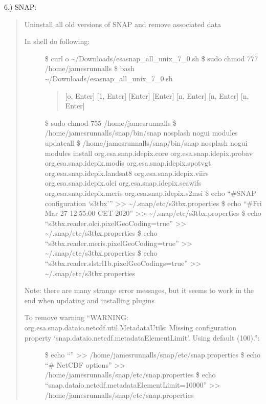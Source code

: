 \documentclass[letterpaper,10pt,english]{sphinxmanual}
\begin{document}
6.) SNAP: 
\begin{quote}

Uninstall all old versions of SNAP and remove associated data
\begin{description}
\item[{In shell do following:}] \leavevmode
\$ curl  \sphinxhyphen{}o \textasciitilde{}/Downloads/esa\sphinxhyphen{}snap\_all\_unix\_7\_0.sh
\$ sudo chmod 777 /home/jamesrunnalls
\$ bash \textasciitilde{}/Downloads/esa\sphinxhyphen{}snap\_all\_unix\_7\_0.sh
\begin{quote}

{[}o, Enter{]}
{[}1, Enter{]}
{[}Enter{]}
{[}Enter{]}
{[}n, Enter{]}
{[}n, Enter{]}
{[}n, Enter{]}
\end{quote}

\$ sudo chmod 755 /home/jamesrunnalls
\$ /home/jamesrunnalls/snap/bin/snap \textendash{}nosplash \textendash{}nogui \textendash{}modules \textendash{}update\sphinxhyphen{}all
\$ /home/jamesrunnalls/snap/bin/snap \textendash{}nosplash \textendash{}nogui \textendash{}modules \textendash{}install org.esa.snap.idepix.core org.esa.snap.idepix.probav org.esa.snap.idepix.modis org.esa.snap.idepix.spotvgt org.esa.snap.idepix.landsat8 org.esa.snap.idepix.viirs org.esa.snap.idepix.olci org.esa.snap.idepix.seawifs org.esa.snap.idepix.meris org.esa.snap.idepix.s2msi
\$ echo “\#SNAP configuration ‘s3tbx’” \textgreater{}\textgreater{} \textasciitilde{}/.snap/etc/s3tbx.properties
\$ echo “\#Fri Mar 27 12:55:00 CET 2020” \textgreater{}\textgreater{} \textasciitilde{}/.snap/etc/s3tbx.properties
\$ echo “s3tbx.reader.olci.pixelGeoCoding=true” \textgreater{}\textgreater{} \textasciitilde{}/.snap/etc/s3tbx.properties
\$ echo “s3tbx.reader.meris.pixelGeoCoding=true” \textgreater{}\textgreater{} \textasciitilde{}/.snap/etc/s3tbx.properties
\$ echo “s3tbx.reader.slstrl1b.pixelGeoCodings=true” \textgreater{}\textgreater{} \textasciitilde{}/.snap/etc/s3tbx.properties

\end{description}

Note: there are many strange error messages, but it seems to work in the end when updating and installing plugins
\begin{description}
\item[{To remove warning “WARNING: org.esa.snap.dataio.netcdf.util.MetadataUtils: Missing configuration property ‘snap.dataio.netcdf.metadataElementLimit’. Using default (100).”:}] \leavevmode
\$ echo “” \textgreater{}\textgreater{} /home/jamesrunnalls/snap/etc/snap.properties
\$ echo “\# NetCDF options” \textgreater{}\textgreater{} /home/jamesrunnalls/snap/etc/snap.properties
\$ echo “snap.dataio.netcdf.metadataElementLimit=10000” \textgreater{}\textgreater{} /home/jamesrunnalls/snap/etc/snap.properties


\end{description}
\end{quote}
\end{document}
